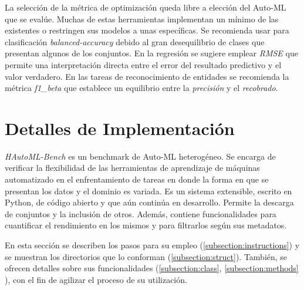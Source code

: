 La selección de la métrica de optimización queda libre a elección del Auto-ML que se evalúe. Muchas de estas herramientas implementan un mínimo de las existentes
o restringen sus modelos a unas específicas. Se recomienda usar para clasificación \textit{balanced-accuracy} debido al gran desequilibrio de clases que presentan 
algunos de los conjuntos. En la regresión se sugiere emplear \textit{RMSE} que permite una interpretación directa entre el error del resultado predictivo y el 
valor verdadero. En las tareas de reconocimiento de entidades se recomienda la métrica \textit{f1\_beta} que establece un equilibrio entre la \textit{precisión} y el 
\textit{recobrado}.

\section{Detalles de Implementación}\label{section:Implementation}
\textit{HAutoML-Bench} es un benchmark de Auto-ML heterogéneo. Se encarga de verificar la flexibilidad de las herramientas de aprendizaje de máquinas automatizado en el enfrentamiento
de tareas en donde la forma en que se presentan los datos y el dominio es variada. Es un sistema extensible, escrito en Python, de código abierto y que aún continúa en 
desarrollo. Permite la descarga de conjuntos y la inclusión de otros. Además, contiene funcionalidades para cuantificar el rendimiento en los mismos y para filtrarlos 
según sus metadatos. 

En esta sección se describen los pasos para su empleo (\ref{subsection:instructions}) y se muestran los directorios que lo conforman 
(\ref{subsection:struct}). También, se ofrecen detalles sobre sus funcionalidades (\ref{subsection:class}, \ref{subsection:methods} ),
con el fin de agilizar el proceso de su utilización.

